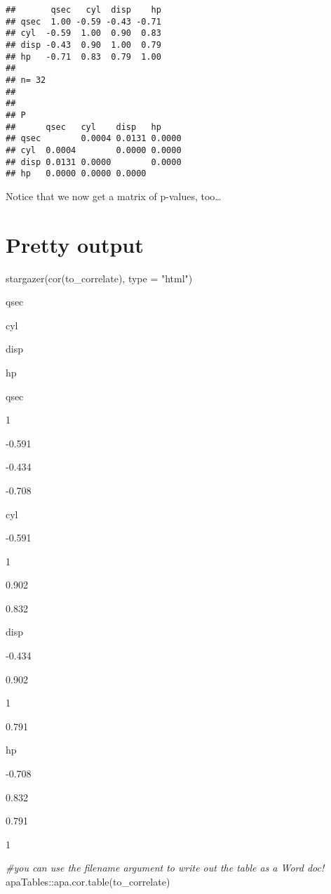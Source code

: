 \documentclass[
]{book}
\newenvironment{Shaded}{\begin{snugshade}}{\end{snugshade}}
\newcommand{\AttributeTok}[1]{\textcolor[rgb]{0.77,0.63,0.00}{#1}}
\newcommand{\CommentTok}[1]{\textcolor[rgb]{0.56,0.35,0.01}{\textit{#1}}}
\newcommand{\FunctionTok}[1]{\textcolor[rgb]{0.00,0.00,0.00}{#1}}
\newcommand{\NormalTok}[1]{#1}
\newcommand{\SpecialCharTok}[1]{\textcolor[rgb]{0.00,0.00,0.00}{#1}}
\newcommand{\StringTok}[1]{\textcolor[rgb]{0.31,0.60,0.02}{#1}}
\begin{document}
\begin{verbatim}
##       qsec   cyl  disp    hp
## qsec  1.00 -0.59 -0.43 -0.71
## cyl  -0.59  1.00  0.90  0.83
## disp -0.43  0.90  1.00  0.79
## hp   -0.71  0.83  0.79  1.00
## 
## n= 32 
## 
## 
## P
##      qsec   cyl    disp   hp    
## qsec        0.0004 0.0131 0.0000
## cyl  0.0004        0.0000 0.0000
## disp 0.0131 0.0000        0.0000
## hp   0.0000 0.0000 0.0000
\end{verbatim}

Notice that we now get a matrix of p-values, too\ldots{}

\hypertarget{pretty-output}{%
\section{Pretty output}\label{pretty-output}}

\begin{Shaded}
\begin{Highlighting}[]
\FunctionTok{stargazer}\NormalTok{(}\FunctionTok{cor}\NormalTok{(to\_correlate), }\AttributeTok{type =} \StringTok{"html"}\NormalTok{)}
\end{Highlighting}
\end{Shaded}

qsec

cyl

disp

hp

qsec

1

-0.591

-0.434

-0.708

cyl

-0.591

1

0.902

0.832

disp

-0.434

0.902

1

0.791

hp

-0.708

0.832

0.791

1

\begin{Shaded}
\begin{Highlighting}[]
\CommentTok{\#you can use the filename argument to write out the table as a Word doc!}
\NormalTok{apaTables}\SpecialCharTok{::}\FunctionTok{apa.cor.table}\NormalTok{(to\_correlate)}
\end{Highlighting}
\end{Shaded}
\end{document}

